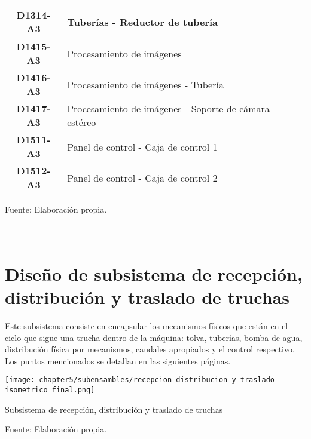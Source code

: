 \begin{mytable}[H]
\begin{tabular}{|c|l|}
		\textbf{D1314-A3}         & Tuberías - Reductor de tubería \\ \hline
		\textbf{D1415-A3}         & Procesamiento de imágenes \\ \hline
		\textbf{D1416-A3}         & Procesamiento de imágenes - Tubería \\ \hline
		\textbf{D1417-A3}         & Procesamiento de imágenes - Soporte de cámara estéreo \\ \hline
		\textbf{D1511-A3}         & Panel de control - Caja de control 1 \\ \hline
		\textbf{D1512-A3}         & Panel de control - Caja de control 2 \\ \hline
	\end{tabular}
	\begin{myflushcenteraftertable}	
		Fuente: Elaboración propia.
	\end{myflushcenteraftertable}
\end{mytable}


\pagestyle{myportland}
\doublespacing
\chapter[\quad\quad\quad\quad ----- Diseño de subsistema de recepción, distribución y traslado de truchas]{\\ Diseño de subsistema de recepción, distribución y traslado de truchas}
\thispagestyle{myportland}

\label{ssec:diseno de subsistema de recepcion, distribucion y traslado de truchas}

Este subsistema consiste en encapsular los mecanismos físicos que están en el ciclo que sigue una trucha dentro de la máquina: tolva, tuberías, bomba de agua, distribución física por mecanismos, caudales apropiados y el control respectivo. Los puntos mencionados se detallan en las siguientes páginas.

\begin{myfigure}[H]
	\footnotesize\centering
	\texttt{[image: chapter5/subensambles/recepcion distribucion y traslado isometrico final.png]}
	\caption{Subsistema de recepción, distribución y traslado de truchas}
	\begin{myflushcenter}
		Fuente: Elaboración propia.
	\end{myflushcenter}
	\label{fig:subsistema de recepción, distribución y traslado de truchas}
\end{myfigure}

